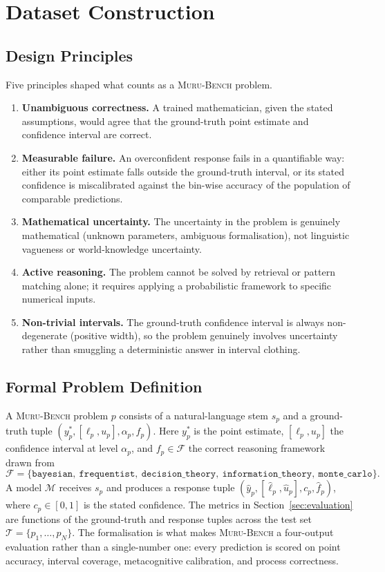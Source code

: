 \documentclass{article}
\newcommand{\muru}{\textsc{Muru-Bench}}
\begin{document}
\section{Dataset Construction}
\label{sec:dataset}

\subsection{Design Principles}

Five principles shaped what counts as a \muru{} problem.

\begin{enumerate}[leftmargin=*,itemsep=2pt]
    \item \textbf{Unambiguous correctness.} A trained mathematician, given the stated assumptions, would agree that the ground-truth point estimate and confidence interval are correct.
    \item \textbf{Measurable failure.} An overconfident response fails in a quantifiable way: either its point estimate falls outside the ground-truth interval, or its stated confidence is miscalibrated against the bin-wise accuracy of the population of comparable predictions.
    \item \textbf{Mathematical uncertainty.} The uncertainty in the problem is genuinely mathematical (unknown parameters, ambiguous formalisation), not linguistic vagueness or world-knowledge uncertainty.
    \item \textbf{Active reasoning.} The problem cannot be solved by retrieval or pattern matching alone; it requires applying a probabilistic framework to specific numerical inputs.
    \item \textbf{Non-trivial intervals.} The ground-truth confidence interval is always non-degenerate (positive width), so the problem genuinely involves uncertainty rather than smuggling a deterministic answer in interval clothing.
\end{enumerate}

\subsection{Formal Problem Definition}
\label{sec:formalization}

A \muru{} problem $p$ consists of a natural-language stem $s_p$ and a ground-truth tuple $(y_p^*, [\ell_p, u_p], \alpha_p, f_p)$. Here $y_p^*$ is the point estimate, $[\ell_p, u_p]$ the confidence interval at level $\alpha_p$, and $f_p \in \mathcal{F}$ the correct reasoning framework drawn from
\[
\mathcal{F} = \{\texttt{bayesian},\ \texttt{frequentist},\ \texttt{decision\_theory},\ \texttt{information\_theory},\ \texttt{monte\_carlo}\}.
\]
A model $\mathcal{M}$ receives $s_p$ and produces a response tuple $(\hat{y}_p, [\hat{\ell}_p, \hat{u}_p], c_p, \hat{f}_p)$, where $c_p \in [0,1]$ is the stated confidence. The metrics in Section~\ref{sec:evaluation} are functions of the ground-truth and response tuples across the test set $\mathcal{T} = \{p_1, \ldots, p_N\}$. The formalisation is what makes \muru{} a four-output evaluation rather than a single-number one: every prediction is scored on point accuracy, interval coverage, metacognitive calibration, and process correctness.
\end{document}
